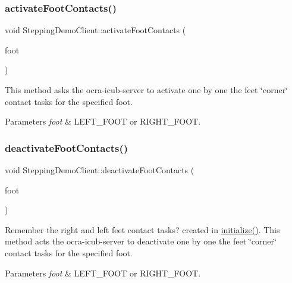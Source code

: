 \subsubsection{\texorpdfstring{activate\+Foot\+Contacts()}{activateFootContacts()}}
{\footnotesize\ttfamily void Stepping\+Demo\+Client\+::activate\+Foot\+Contacts (\begin{DoxyParamCaption}\item[{\hyperlink{SteppingDemoClient_8h_ab0673d7f17cdd57b8fa124abb330287f}{F\+O\+O\+T\+\_\+\+C\+O\+N\+T\+A\+C\+TS}}]{foot }\end{DoxyParamCaption})\hspace{0.3cm}{\ttfamily [private]}}

This method asks the ocra-\/icub-\/server to activate one by one the feet \char`\"{}corner\char`\"{} contact tasks for the specified foot.


\begin{DoxyParams}{Parameters}
{\em foot} & L\+E\+F\+T\+\_\+\+F\+O\+OT or R\+I\+G\+H\+T\+\_\+\+F\+O\+OT. \\
\hline
\end{DoxyParams}
\hypertarget{classSteppingDemoClient_a62b5028bdc99de117cfffc576478a0f1}{}\label{classSteppingDemoClient_a62b5028bdc99de117cfffc576478a0f1} 
\subsubsection{\texorpdfstring{deactivate\+Foot\+Contacts()}{deactivateFootContacts()}}
{\footnotesize\ttfamily void Stepping\+Demo\+Client\+::deactivate\+Foot\+Contacts (\begin{DoxyParamCaption}\item[{\hyperlink{SteppingDemoClient_8h_ab0673d7f17cdd57b8fa124abb330287f}{F\+O\+O\+T\+\_\+\+C\+O\+N\+T\+A\+C\+TS}}]{foot }\end{DoxyParamCaption})\hspace{0.3cm}{\ttfamily [private]}}

Remember the right and left feet contact tasks? created in \hyperlink{classSteppingDemoClient_a08dce195eece162eed175ac9487667c2}{initialize()}. This method acts the ocra-\/icub-\/server to deactivate one by one the feet \char`\"{}corner\char`\"{} contact tasks for the specified foot.


\begin{DoxyParams}{Parameters}
{\em foot} & L\+E\+F\+T\+\_\+\+F\+O\+OT or R\+I\+G\+H\+T\+\_\+\+F\+O\+OT. \\
\hline
\end{DoxyParams}
\hypertarget{classSteppingDemoClient_a857aa530a4ab94443d0b0869121baf76}{}\label{classSteppingDemoClient_a857aa530a4ab94443d0b0869121baf76} 
